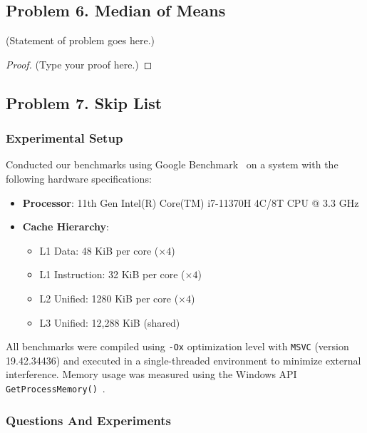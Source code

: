 \documentclass[12pt]{article}
\begin{document}
	\vspace{2in} %
	
	
	\subsection*{Problem 6. Median of Means}
	(Statement of problem goes here.)\\
	
	\begin{proof}
		(Type your proof here.)
	\end{proof}
	
	\vspace{2in} %
	
	
	\subsection*{Problem 7. Skip List}
	\vspace{20pt}
	\subsubsection*{Experimental Setup}
	Conducted our benchmarks using Google Benchmark~\cite{google-bench} on a system with the following hardware specifications:

\begin{itemize}
    \item \textbf{Processor}: 11th Gen Intel(R) Core(TM) i7-11370H 4C/8T CPU @ 3.3 GHz
    \item \textbf{Cache Hierarchy}:
    \begin{itemize}
        \item L1 Data: 48 KiB per core (\(\times 4\))
        \item L1 Instruction: 32 KiB per core (\(\times 4\))
        \item L2 Unified: 1280 KiB per core (\(\times 4\))
        \item L3 Unified: 12,288 KiB (shared)
    \end{itemize}
\end{itemize}

All benchmarks were compiled using \texttt{-Ox} optimization level with \texttt{MSVC} (version 19.42.34436) and executed in a single-threaded environment to minimize external interference. Memory usage was measured using the Windows API \texttt{GetProcessMemory()}~\cite{getprocessmemoryinfo}.\\

\subsubsection*{Questions And Experiments}
	
\end{document}
